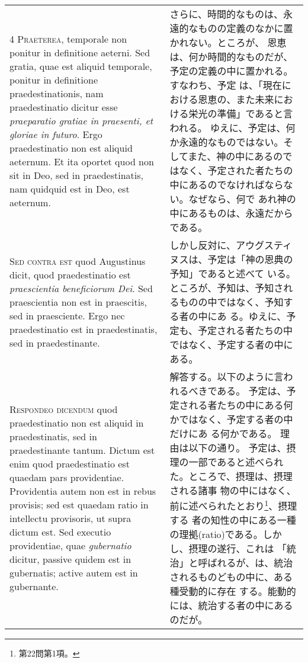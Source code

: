 \documentclass[10pt]{jsarticle} %
\begin{document}
\begin{longtable}{p{21em}p{21em}}
\\


{\scshape  4 Praeterea}, temporale non ponitur in
definitione aeterni. Sed gratia, quae est aliquid temporale, ponitur in
definitione praedestinationis, nam praedestinatio dicitur esse
{\itshape praeparatio gratiae in praesenti, et gloriae in futuro}. Ergo
praedestinatio non est aliquid aeternum. Et ita oportet quod non sit in
Deo, sed in praedestinatis, nam quidquid est in Deo, est aeternum.


&


 さらに、時間的なものは、永遠的なものの定義のなかに置かれない。ところが、
 恩恵は、何か時間的なものだが、予定の定義の中に置かれる。すなわち、予定
 は、「現在における恩恵の、また未来における栄光の準備」であると言われる。
 ゆえに、予定は、何か永遠的なものではない。そしてまた、神の中にあるので
 はなく、予定された者たちの中にあるのでなければならない。なぜなら、何で
 あれ神の中にあるものは、永遠だからである。

 

\\


{\scshape  Sed contra est} quod Augustinus dicit, quod
praedestinatio est {\itshape praescientia beneficiorum Dei}. Sed praescientia non
est in praescitis, sed in praesciente. Ergo nec praedestinatio est in
praedestinatis, sed in praedestinante.


&

しかし反対に、アウグスティヌスは、予定は「神の恩典の予知」であると述べて
 いる。ところが、予知は、予知されるものの中ではなく、予知する者の中にあ
 る。ゆえに、予定も、予定される者たちの中ではなく、予定する者の中にある。
 

\\


{\scshape Respondeo dicendum} quod praedestinatio non est
aliquid in praedestinatis, sed in praedestinante tantum. Dictum est enim
quod praedestinatio est quaedam pars providentiae. Providentia autem non
est in rebus provisis; sed est quaedam ratio in intellectu provisoris,
ut supra dictum est. Sed executio providentiae, quae {\itshape gubernatio} dicitur,
 passive quidem est in gubernatis; active autem est in gubernante.


 &

 解答する。以下のように言われるべきである。
 予定は、予定される者たちの中にある何かではなく、予定する者の中だけにあ
 る何かである。
 理由は以下の通り。
 予定は、摂理の一部であると述べられた。ところで、摂理は、摂理される諸事
 物の中にはなく、前に述べられたとおり\footnote{第22問第1項。}、摂理する
 者の知性の中にある一種の理拠(ratio)である。しかし、摂理の遂行、これは
 「統治」と呼ばれるが、は、統治されるものどもの中に、ある種受動的に存在
 する。能動的には、統治する者の中にあるのだが。


\end{longtable}
\end{document}

